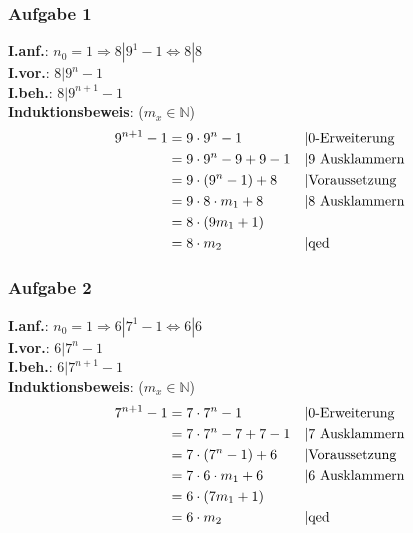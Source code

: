 \subsubsection{Aufgabe 1}
\textbf{I.anf.}: $ n_0 = 1 \Rightarrow 8|9^1-1 \Leftrightarrow 8|8$\\
\textbf{I.vor.}: $ 8 | 9^n-1 $\\
\textbf{I.beh.}: $ 8 | 9^{n+1}-1 $\\
\textbf{Induktionsbeweis}: ($m_x \in \mathbb{N}$)\begin{align*}
9^{n+1}-1 &= 9 \cdot 9^n - 1 						&& \text{\textbar 0-Erweiterung}\\
					&= 9 \cdot 9^n - 9 + 9 - 1		&& \text{\textbar $9$ Ausklammern}\\
					&= 9 \cdot (9^n - 1) + 8 			&& \text{\textbar Voraussetzung}\\
					&= 9 \cdot 8 \cdot m_1 + 8 		&& \text{\textbar $8$ Ausklammern}\\
					&= 8 \cdot (9m_1 + 1) 				\\
					&= 8 \cdot m_2  							&& \text{\textbar qed}\end{align*}		
\subsubsection{Aufgabe 2}
\textbf{I.anf.}: $ n_0 = 1  \Rightarrow 6|7^1-1 \Leftrightarrow 6|6$\\
\textbf{I.vor.}: $ 6 | 7^n-1 $\\
\textbf{I.beh.}: $ 6 | 7^{n+1}-1 $\\
\textbf{Induktionsbeweis}: ($m_x \in \mathbb{N}$)\begin{align*}
7^{n+1}-1 &= 7 \cdot 7^n - 1 							&& \text{\textbar 0-Erweiterung}\\
					&= 7 \cdot 7^n - 7 + 7 - 1			&& \text{\textbar $7$ Ausklammern}\\
					&= 7 \cdot (7^n - 1) + 6 				&& \text{\textbar Voraussetzung}\\
					&= 7 \cdot 6 \cdot m_1 + 6			&& \text{\textbar $6$ Ausklammern}\\
					&= 6 \cdot (7m_1 + 1) 					\\
					&= 6 \cdot m_2  								&& \text{\textbar qed}\\
\end{align*}		
